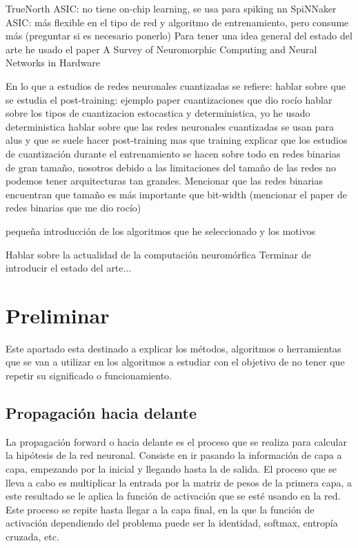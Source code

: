 TrueNorth ASIC: no tiene on-chip learning, se usa para spiking nn
SpiNNaker ASIC: más flexible en el tipo de red y algoritmo de entrenamiento, pero consume más
(preguntar si es necesario ponerlo)
Para tener una idea general del estado del arte he usado el paper A Survey of Neuromorphic Computing and Neural Networks in Hardware \cite{DBLP:journals/corr/SchumanPPBDRP17}

En lo que a estudios de redes neuronales cuantizadas se refiere:
hablar sobre que se estudia el post-training: ejemplo paper cuantizaciones que dio rocío
hablar sobre los tipos de cuantizacion estocastica y deterministica, yo he usado deterministica
hablar sobre que las redes neuronales cuantizadas se usan para alus y que se suele hacer post-training mas que training
explicar que los estudios de cuantización durante el entrenamiento se hacen sobre todo en redes binarias de gran tamaño, nosotros debido a las limitaciones del tamaño de las redes no podemos tener arquitecturas tan grandes. Mencionar que las redes binarias encuentran que tamaño es más importante que bit-width (mencionar el paper de redes binarias que me dio rocío)


pequeña introducción de los algoritmos que he seleccionado y los motivos

Hablar sobre la actualidad de la computación neuromórfica
Terminar de introducir el estado del arte...


\section{Preliminar}

Este apartado esta destinado a explicar los métodos, algoritmos o herramientas que se van a utilizar en los algoritmos a estudiar con el objetivo de no tener que repetir su significado o funcionamiento.


\subsection{Propagación hacia delante}

La propagación forward o hacia delante es el proceso que se realiza para calcular la hipótesis de la red neuronal. Consiste en ir pasando la información de capa a capa, empezando por la inicial y llegando hasta la de salida. El proceso que se lleva a cabo es multiplicar la entrada por la matriz de pesos de la primera capa, a este resultado se le aplica la función de activación que se esté usando en la red. Este proceso se repite hasta llegar a la capa final, en la que la función de activación dependiendo del problema puede ser la identidad, softmax, entropía cruzada, etc.


